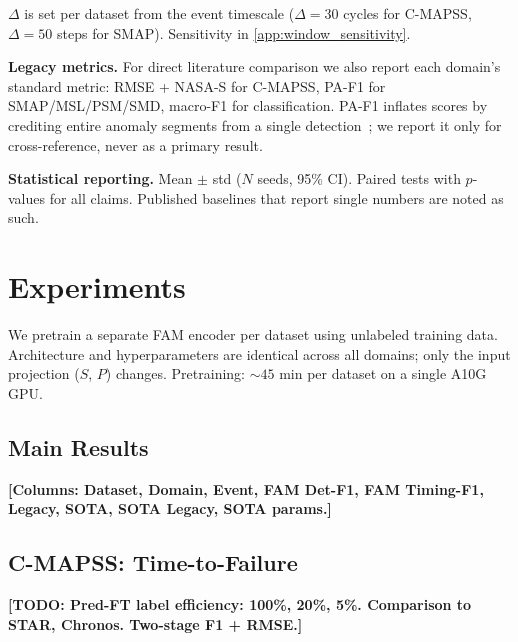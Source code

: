 \documentclass{article}
\newcommand{\placeholder}[1]{{\color{red}\textbf{[#1]}}}
\newcommand{\todo}[1]{{\color{orange}\textbf{[TODO: #1]}}}
\newcommand{\placeholder}[1]{#1}
\newcommand{\todo}[1]{}
\begin{document}
$\Delta$ is set per dataset from the event timescale ($\Delta{=}30$ cycles for C-MAPSS, $\Delta{=}50$ steps for SMAP). Sensitivity in \cref{app:window_sensitivity}.

\textbf{Legacy metrics.} For direct literature comparison we also report each domain's standard metric: RMSE + NASA-S for C-MAPSS, PA-F1 for SMAP/MSL/PSM/SMD, macro-F1 for classification. PA-F1 inflates scores by crediting entire anomaly segments from a single detection~\citep{schmidl2022tsadeval}; we report it only for cross-reference, never as a primary result.

\textbf{Statistical reporting.} Mean $\pm$ std ($N$ seeds, 95\% CI). Paired tests with $p$-values for all claims. Published baselines that report single numbers are noted as such.

\section{Experiments}
\label{sec:experiments}

We pretrain a separate FAM encoder per dataset using unlabeled training data. Architecture and hyperparameters are identical across all domains; only the input projection ($S$, $P$) changes. Pretraining: ${\sim}45$ min per dataset on a single A10G GPU.

\subsection{Main Results}
\label{sec:benchmark}

\begin{table}[t]
\centering
\caption{\textbf{Event prediction across \placeholder{M} domains.} Same architecture and pretraining recipe everywhere. Detection F1 at horizon $H$; legacy metric per domain convention. \placeholder{Fill from v20.}}
\label{tab:benchmark}
\small
\placeholder{Columns: Dataset, Domain, Event, FAM Det-F1, FAM Timing-F1, Legacy, SOTA, SOTA Legacy, SOTA params.}
\end{table}

\subsection{C-MAPSS: Time-to-Failure}
\label{sec:rul_results}

\todo{Pred-FT label efficiency: 100\%, 20\%, 5\%. Comparison to STAR, Chronos. Two-stage F1 + RMSE.}
\end{document}

